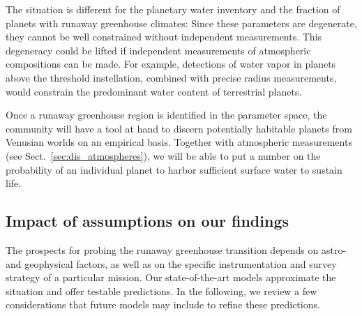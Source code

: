 \documentclass[twocolumn,twocolappendix,linenumbers]{aastex631}
\begin{document}
The situation is different for the planetary water inventory and the fraction of planets with runaway greenhouse climates:
Since these parameters are degenerate, they cannot be well constrained without independent measurements.
This degeneracy could be lifted if independent measurements of atmospheric compositions can be made.
For example, detections of water vapor in planets above the threshold instellation, combined with precise radius measurements, would constrain the predominant water content of terrestrial planets.

Once a runaway greenhouse region is identified in the parameter space, the community will  have a tool at hand to discern potentially habitable planets from Venusian worlds on an empirical basis.
Together with atmospheric measurements (see Sect.~\ref{sec:dis_atmospheres}), we will be able to put a number on the probability of an individual planet to harbor sufficient surface water to sustain life.


\subsection{Impact of assumptions on our findings}
The prospects for probing the runaway greenhouse transition depends on astro- and geophysical factors, as well as on the specific instrumentation and survey strategy of a particular mission.
Our state-of-the-art models approximate the situation and offer testable predictions.
In the following, we review a few considerations that future models may include to refine these predictions.
\end{document}
